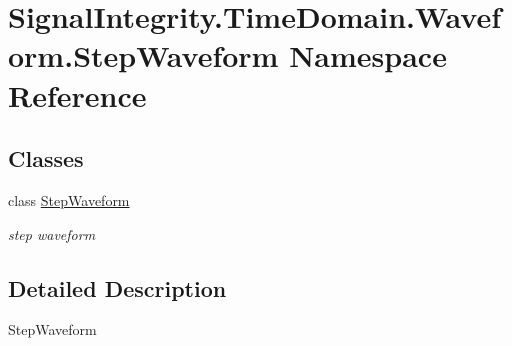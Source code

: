 \hypertarget{namespaceSignalIntegrity_1_1TimeDomain_1_1Waveform_1_1StepWaveform}{}\section{Signal\+Integrity.\+Time\+Domain.\+Waveform.\+Step\+Waveform Namespace Reference}
\label{namespaceSignalIntegrity_1_1TimeDomain_1_1Waveform_1_1StepWaveform}
\subsection*{Classes}
\begin{DoxyCompactItemize}
\item 
class \hyperlink{classSignalIntegrity_1_1TimeDomain_1_1Waveform_1_1StepWaveform_1_1StepWaveform}{Step\+Waveform}
\begin{DoxyCompactList}\small\item\em step waveform \end{DoxyCompactList}\end{DoxyCompactItemize}


\subsection{Detailed Description}
\begin{DoxyVerb}StepWaveform\end{DoxyVerb}
 